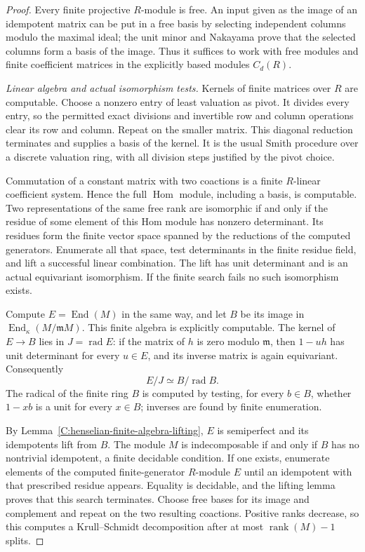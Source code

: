 \begin{proof}
Every finite projective $R$-module is free.  An input given
as the image of an idempotent matrix can be put in a free
basis by selecting independent columns modulo the maximal
ideal; the unit minor and Nakayama prove that the selected
columns form a basis of the image.  Thus it suffices to
work with free modules and finite coefficient matrices
in the explicitly based modules $C_d(R)$.

\emph{Linear algebra and actual isomorphism tests.}
Kernels of finite matrices over $R$ are computable.
Choose a nonzero entry of least valuation as pivot.  It
divides every entry, so the permitted exact divisions and
invertible row and column operations clear its row and
column.  Repeat on the smaller matrix.  This diagonal
reduction terminates and supplies a basis of the kernel.
It is the usual Smith procedure over a discrete valuation
ring, with all division steps justified by the pivot choice.

Commutation of a constant matrix with two coactions is a
finite $R$-linear coefficient system.  Hence the full
$\operatorname{Hom}$ module, including a basis, is computable.
Two representations of the same free rank are isomorphic
if and only if the residue of some element of this Hom
module has nonzero determinant.  Its residues form the
finite vector space spanned by the reductions of the
computed generators.  Enumerate all that space, test
determinants in the finite residue field, and lift a
successful linear combination.  The lift has unit
determinant and is an actual equivariant isomorphism.
If the finite search fails no such isomorphism exists.

Compute $E=\operatorname{End}(M)$ in the same way, and let
$B$ be its image in
$\operatorname{End}_{\kappa}(M/\mathfrak mM)$.
This finite algebra is explicitly computable.  The kernel
of $E\to B$ lies in $J=\operatorname{rad}E$: if the matrix
of $h$ is zero modulo $\mathfrak m$, then $1-uh$ has unit
determinant for every $u\in E$, and its inverse matrix is
again equivariant.  Consequently
\[
                    E/J\simeq B/\operatorname{rad}B.       \tag{C.3.HD3}
\]
The radical of the finite ring $B$ is computed by testing,
for every $b\in B$, whether $1-xb$ is a unit for every
$x\in B$; inverses are found by finite enumeration.

By Lemma~\ref{C:henselian-finite-algebra-lifting}, $E$ is
semiperfect and its idempotents lift from $B$.
The module $M$ is indecomposable if and only if $B$ has
no nontrivial idempotent, a finite decidable condition.
If one exists, enumerate elements of the computed
finite-generator $R$-module $E$ until an idempotent with
that prescribed residue appears.  Equality is decidable,
and the lifting lemma proves that this search terminates.
Choose free bases for its image and complement and repeat
on the two resulting coactions.  Positive ranks decrease,
so this computes a Krull--Schmidt decomposition after at
most $\operatorname{rank}(M)-1$ splits.


\end{proof}
